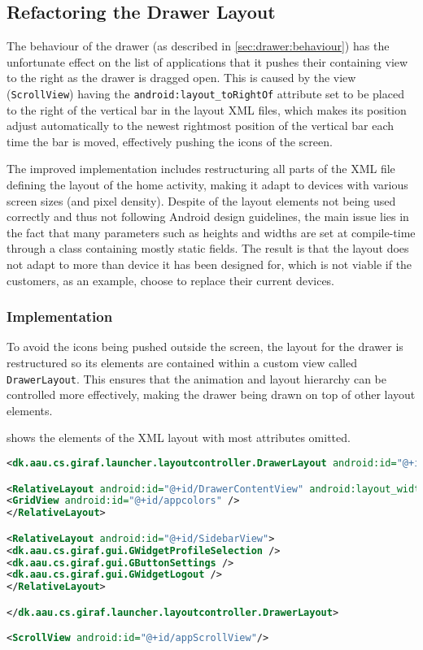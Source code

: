 \subsection{Refactoring the Drawer Layout}
The behaviour of the drawer (as described in \cref{sec:drawer:behaviour}) has the unfortunate effect on the list of applications that it pushes their containing view to the right as the drawer is dragged open.
This is caused by the view (\lstinline|ScrollView|) having the  \lstinline{android:layout_toRightOf} attribute set to be placed to the right of the vertical bar in the layout XML files, which makes its position adjust automatically to the newest rightmost position of the vertical bar each time the bar is moved, effectively pushing the icons of the screen.

The improved implementation includes restructuring all parts of the XML file defining the layout of the home activity, making it adapt to devices with various screen sizes (and pixel density).
Despite of the layout elements not being used correctly and thus not following Android design guidelines, the main issue lies in the fact that many parameters such as heights and widths are set at compile-time through a class containing mostly static fields.
The result is that the layout does not adapt to more than device it has been designed for, which is not viable if the customers, as an example, choose to replace their current devices.

\subsubsection{Implementation}\label{sec:sidebarlayout:xml}
To avoid the icons being pushed outside the screen, the layout for the drawer is restructured so its elements are contained within a custom view called \lstinline|DrawerLayout|.
This ensures that the animation and layout hierarchy can be controlled more effectively, making the drawer being drawn on top of other layout elements.

 shows the elements of the XML layout with most attributes omitted.

\begin{lstlisting}[caption={Structure of the XML layout of the drawer.},label={lst:sidebarlayout}, language=XML]
<dk.aau.cs.giraf.launcher.layoutcontroller.DrawerLayout android:id="@+id/DrawerView" android:layout_marginLeft="-400dp">

<RelativeLayout android:id="@+id/DrawerContentView" android:layout_width="400dp">
<GridView android:id="@+id/appcolors" />
</RelativeLayout>

<RelativeLayout android:id="@+id/SidebarView">
<dk.aau.cs.giraf.gui.GWidgetProfileSelection />
<dk.aau.cs.giraf.gui.GButtonSettings />
<dk.aau.cs.giraf.gui.GWidgetLogout />
</RelativeLayout>

</dk.aau.cs.giraf.launcher.layoutcontroller.DrawerLayout>

<ScrollView android:id="@+id/appScrollView"/>
\end{lstlisting}

